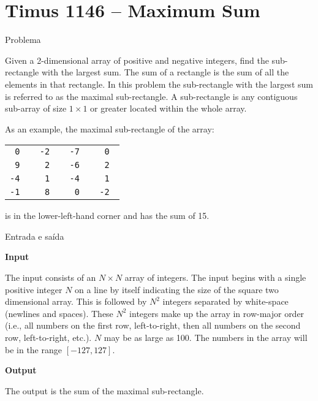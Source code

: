 \section{Timus 1146 -- Maximum Sum}

\begin{frame}[fragile]{Problema}

Given a 2-dimensional array of positive and negative integers, find the sub-rectangle with the
largest sum. The sum of a rectangle is the sum of all the elements in that rectangle. In this
problem the sub-rectangle with the largest sum is referred to as the maximal sub-rectangle. A
sub-rectangle is any contiguous sub-array of size $1\times 1$ or greater located within the whole
array.

As an example, the maximal sub-rectangle of the array:
    \begin{table}[!ht]
        \begin{tabular}{>{\tt}r>{\tt}r>{\tt}r>{\tt}r}
            0 & -2 & -7 & 0 \\
            \textcolor{blue!60}{9} & \textcolor{blue!60}{2} & -6 & 2 \\
            \textcolor{blue!60}{-4} & \textcolor{blue!60}{1} & -4 & 1 \\
            \textcolor{blue!60}{-1} & \textcolor{blue!60}{8} & 0 & -2 \\
        \end{tabular}
    \end{table}

is in the lower-left-hand corner and has the sum of 15.

\end{frame}

\begin{frame}[fragile]{Entrada e saída}

\textbf{Input}

The input consists of an $N\times N$ array of integers. The input begins with a single positive
integer $N$ on a line by itself indicating the size of the square two dimensional array. This is
followed by $N^2$ integers separated by white-space (newlines and spaces). These $N^2$ integers
make up the array in row-major order (i.e., all numbers on the first row, left-to-right, then all
numbers on the second row, left-to-right, etc.). $N$ may be as large as 100. The numbers in the
array will be in the range $[-127, 127]$.

\vspace{0.2in}

\textbf{Output}

The output is the sum of the maximal sub-rectangle.

\end{frame}

